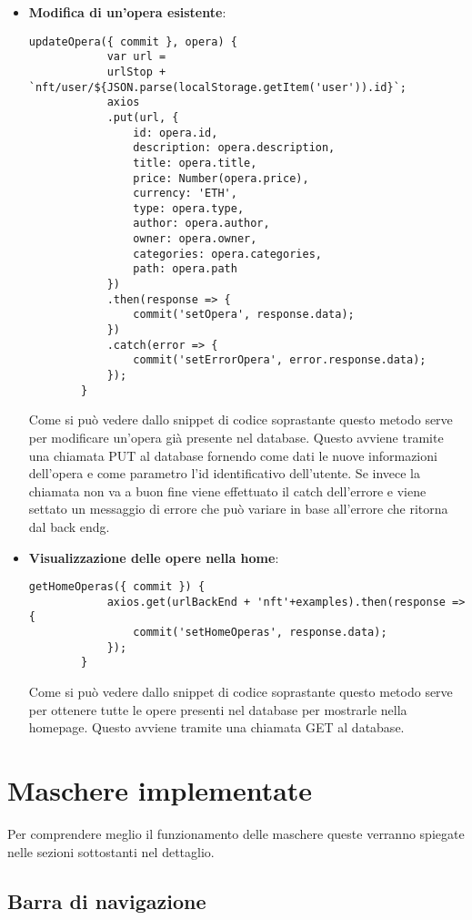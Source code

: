 \begin{itemize}
	\item \textbf{Modifica di un'opera esistente}:
	\begin{lstlisting}[caption=Modifica di un'opera esistente., label=lst::modOpera]
		updateOpera({ commit }, opera) {
			var url =
			urlStop + `nft/user/${JSON.parse(localStorage.getItem('user')).id}`;
			axios
			.put(url, {
				id: opera.id,
				description: opera.description,
				title: opera.title,
				price: Number(opera.price),
				currency: 'ETH',
				type: opera.type,
				author: opera.author,
				owner: opera.owner,
				categories: opera.categories,
				path: opera.path
			})
			.then(response => {
				commit('setOpera', response.data);
			})
			.catch(error => {
				commit('setErrorOpera', error.response.data);
			});
		}
	\end{lstlisting}
	Come si può vedere dallo snippet di codice soprastante questo metodo serve per modificare un'opera già presente nel database. Questo avviene tramite una chiamata PUT al database fornendo come dati le nuove informazioni dell'opera e come parametro l'id identificativo dell'utente. Se invece  la chiamata non va a buon fine viene effettuato il catch dell'errore e viene settato un messaggio di errore che può variare in base all'errore che ritorna dal \gls{back endg}.
	\item \textbf{Visualizzazione delle opere nella home}:
	\begin{lstlisting}[caption=Visualizzazione delle opere nella home., label=lst::visOpereHome]
		getHomeOperas({ commit }) {
			axios.get(urlBackEnd + 'nft'+examples).then(response => {
				commit('setHomeOperas', response.data);
			});
		}
	\end{lstlisting}
	Come si può vedere dallo snippet di codice soprastante questo metodo serve per ottenere tutte le opere presenti nel database per mostrarle nella homepage. Questo avviene tramite una chiamata GET al database.
\end{itemize}

\section{Maschere implementate}
\label{sec:maschere-implementate}

Per comprendere meglio il funzionamento delle maschere queste verranno spiegate nelle sezioni sottostanti nel dettaglio.

\subsection{Barra di navigazione}
\label{subsec:barra-navigazione}

